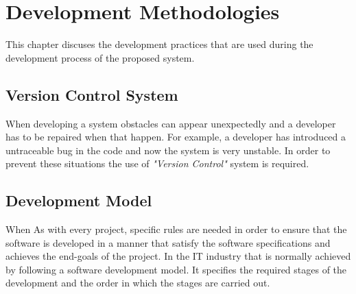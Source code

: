 \chapter{Development Methodologies}
This chapter discuses the development practices that are used during the development process of the proposed system.  

\section{Version Control System}
When developing a system obstacles can appear unexpectedly and a developer has to be repaired when that happen. For example, a developer has introduced a untraceable bug in the code and now the system is very unstable. In order to prevent these situations the use of \textit{"Version Control"} system is required.

\section{Development Model}
When As with every project, specific rules are needed in order to ensure that the software is developed in a manner that satisfy the software specifications and achieves the end-goals of the project. In the IT industry that is normally achieved by following a software development model. It specifies the required stages of the development and the order in which the stages are carried out.